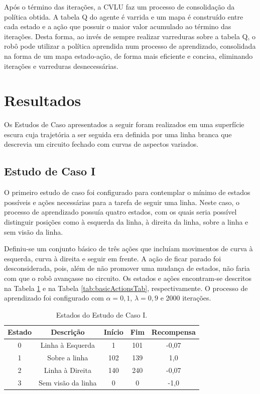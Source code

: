 \documentclass[a4paper]{ifacconf}
\begin{document}
Após o término das iterações, a CVLU faz um processo de consolidação da política obtida. A tabela Q do agente é varrida e um mapa é construído entre cada estado e a ação que possuir o maior valor acumulado ao término das iterações. Desta forma, ao invés de sempre realizar varreduras sobre a tabela Q, o robô pode utilizar a política aprendida num processo de aprendizado, consolidada na forma de um mapa estado-ação, de forma mais eficiente e concisa, eliminando iterações e varreduras desnecessárias.

\section{Resultados}

Os Estudos de Caso apresentados a seguir foram realizados em uma superfície escura cuja trajetória a ser seguida era definida por uma linha branca que descrevia um circuito fechado com curvas de aspectos variados.

\subsection{Estudo de Caso I}

O primeiro estudo de caso foi configurado  para contemplar o mínimo de estados possíveis e ações necessárias para a tarefa de seguir uma linha. Neste caso, o processo de aprendizado possuía quatro estados, com os quais seria possível distinguir posições como à esquerda da linha, à direita da linha, sobre a linha e sem visão da linha. 

Definiu-se um conjunto básico de três ações que incluíam movimentos de curva à esquerda, curva à direita e seguir em frente. A ação de ficar parado foi desconsiderada, pois, além de não promover uma mudança de estados, não faria com que o robô avançasse no circuito. Os estados e ações encontram-se descritos na Tabela \ref{tab:basicStatesTab} e na Tabela \ref{tab:basicActionsTab}, respectivamente. O processo de aprendizado foi configurado com $\alpha = 0,1$, $\lambda = 0,9$ e 2000 iterações. 

\begin{table}[htb]
\centering
\caption{Estados do Estudo de Caso I.} \label{tab:basicStatesTab}
\begin{tabular}{ccccc}
Estado & Descrição & Início & Fim & Recompensa\\ \hline
0 & Linha à Esquerda & 1 & 101 & -0,07\\
1 & Sobre a linha & 102 & 139 & 1,0\\ 
2 & Linha à Direita & 140 & 240 & -0,07\\
3 & Sem visão da linha  & 0 & 0 & -1,0\\ \hline
\end{tabular}
\end{table}
\end{document}
